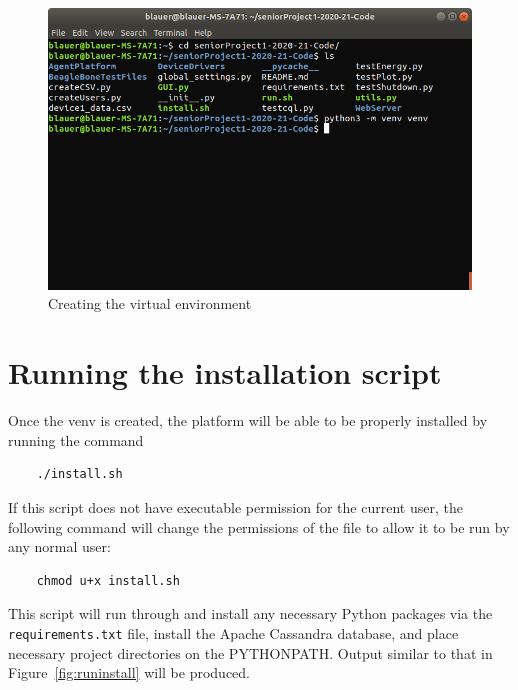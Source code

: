 \begin{figure}[H]
    \centering
    \includegraphics[scale=0.4]{figs/createvenv.png}
    \caption{Creating the virtual environment}
    \label{fig:createvenv}
\end{figure}

\section{Running the installation script}
Once the venv is created, the platform will be able to be properly installed by running the command
\begin{verbatim}
    ./install.sh
\end{verbatim}
If this script does not have executable permission for the current user, the following command will change the permissions of the file to allow it to be run by any normal user:
\begin{verbatim}
    chmod u+x install.sh
\end{verbatim}
This script will run through and install any necessary Python packages via the \texttt{requirements.txt} file, install the Apache Cassandra database, and place necessary project directories on the PYTHONPATH. Output similar to that in Figure~\ref{fig:runinstall} will be produced.

